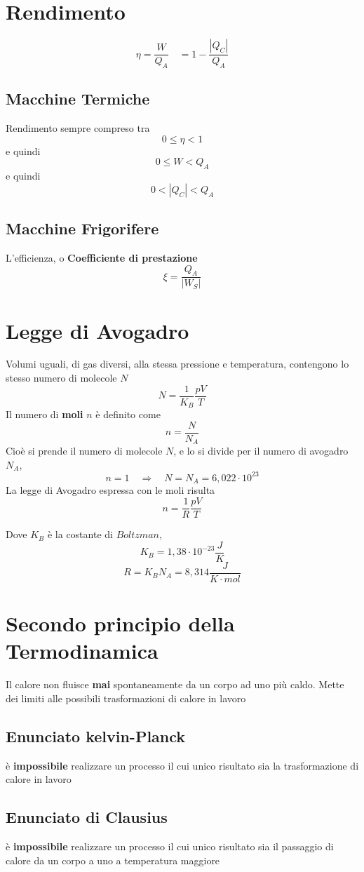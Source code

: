 \documentclass[a4paper]{report}
\begin{document}
  \section{Rendimento}
  \[ \eta=\frac{W}{Q_A} \quad = 1- \frac{|Q_C|}{Q_A}\]
  \subsection{Macchine Termiche}
  Rendimento sempre compreso tra
  \[0 \leq \eta < 1\]
  e quindi
  \[0 \leq W < Q_A \]
  e quindi
  \[ 0 < |Q_C| < Q_A \]
  \subsection {Macchine Frigorifere}
  L'efficienza, o \textbf{Coefficiente di prestazione}
  \[ \xi = \frac{Q_A}{|W_S|}  \]

  \section{Legge di Avogadro}
  Volumi uguali, di gas diversi, alla stessa pressione e temperatura, contengono lo stesso numero di molecole $N$
  \[ N = \frac{1}{K_B} \frac{pV}{T} \]
  Il numero di \textbf{moli} $n$ è definito come
  \[ n = \frac{N}{N_A} \]
  Cioè si prende il numero di molecole $N$, e lo si divide per il numero di avogadro $N_A$,
  \[ n = 1 \quad \Rightarrow \quad N = N_A = 6,022 \cdot 10^{23}\]
  La legge di Avogadro espressa con le moli risulta
  \[ n = \frac{1}{R} \frac{pV}{T} \]

  Dove $K_B$ è la costante di $Boltzman$,
  \[ K_B = 1,38 \cdot 10^{-23} \frac{J}{K}\]
  \[ R = K_B N_A = 8,314 \frac{J}{K \cdot mol} \]


  \section{Secondo principio della Termodinamica}
  Il calore non fluisce \textbf{mai} spontaneamente da un corpo ad uno più caldo.
  Mette dei limiti alle possibili trasformazioni di calore in lavoro\\
  \subsection{Enunciato kelvin-Planck}
  è \textbf{impossibile} realizzare un processo il cui unico risultato sia la trasformazione di calore in lavoro
  \subsection{Enunciato di Clausius}
  è \textbf{impossibile} realizzare un processo il cui unico risultato sia il passaggio di calore da un corpo a uno a temperatura maggiore
\end{document}
